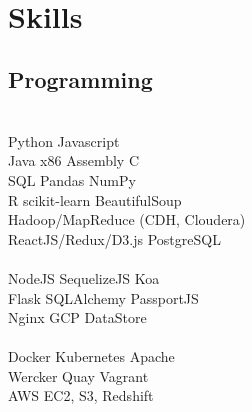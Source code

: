 \documentclass[]{deedy-resume-openfont}
\begin{document}
\begin{minipage}[t]{0.31\textwidth}
\\[1\baselineskip]


\section{Skills}
\subsection{Programming}
\\[1\baselineskip]

Python \textbullet{} Javascript
\\[1\baselineskip]

 Java \textbullet{} x86 Assembly \textbullet{} C
\\[1\baselineskip]

SQL \textbullet{} Pandas \textbullet{} NumPy \\
R \textbullet{} scikit-learn \textbullet{} BeautifulSoup \\
Hadoop/MapReduce (CDH, Cloudera) \\
ReactJS/Redux/D3.js \textbullet{} PostgreSQL \\
\\[1\baselineskip]

NodeJS \textbullet{} SequelizeJS \textbullet{} Koa\\
Flask \textbullet{} SQLAlchemy \textbullet{} PassportJS\\
Nginx \textbullet{} GCP DataStore\\
\\[1\baselineskip]

Docker \textbullet{} Kubernetes \textbullet{} Apache \\
Wercker \textbullet{}  Quay \textbullet{} Vagrant \\
AWS EC2, S3, Redshift
\\[1\baselineskip]



\sectionsep



\end{minipage}
\end{document}
